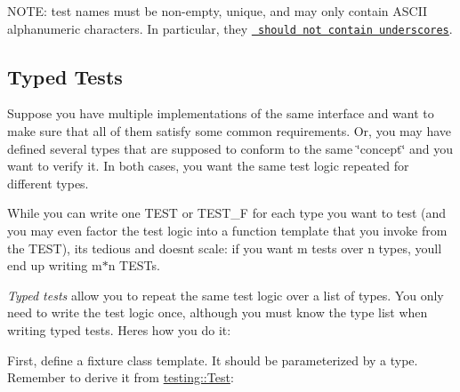 N\+O\+TE\+: test names must be non-\/empty, unique, and may only contain A\+S\+C\+II alphanumeric characters. In particular, they \href{https://github.com/google/googletest/blob/master/googletest/docs/faq.md\#why-should-test-suite-names-and-test-names-not-contain-underscore}{\texttt{ should not contain underscores}}.


\begin{DoxyCode}{0}
\DoxyCodeLine{}
\DoxyCodeLine{\{}
\DoxyCodeLine{\}}
\DoxyCodeLine{}
\end{DoxyCode}


\subsection*{Typed Tests}

Suppose you have multiple implementations of the same interface and want to make sure that all of them satisfy some common requirements. Or, you may have defined several types that are supposed to conform to the same \char`\"{}concept\char`\"{} and you want to verify it. In both cases, you want the same test logic repeated for different types.

While you can write one {\ttfamily T\+E\+ST} or {\ttfamily T\+E\+S\+T\+\_\+F} for each type you want to test (and you may even factor the test logic into a function template that you invoke from the {\ttfamily T\+E\+ST}), it\textquotesingle{}s tedious and doesn\textquotesingle{}t scale\+: if you want {\ttfamily m} tests over {\ttfamily n} types, you\textquotesingle{}ll end up writing {\ttfamily m$\ast$n} {\ttfamily T\+E\+ST}s.

{\itshape Typed tests} allow you to repeat the same test logic over a list of types. You only need to write the test logic once, although you must know the type list when writing typed tests. Here\textquotesingle{}s how you do it\+:

First, define a fixture class template. It should be parameterized by a type. Remember to derive it from {\ttfamily \mbox{\hyperlink{classtesting_1_1_test}{testing\+::\+Test}}}\+:


\begin{DoxyCode}{0}
\DoxyCodeLine{\};}
\end{DoxyCode}


